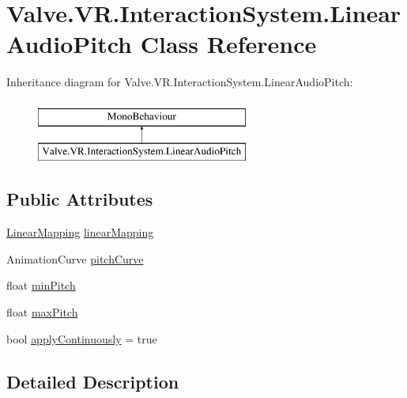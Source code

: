 \hypertarget{class_valve_1_1_v_r_1_1_interaction_system_1_1_linear_audio_pitch}{}\section{Valve.\+V\+R.\+Interaction\+System.\+Linear\+Audio\+Pitch Class Reference}
\label{class_valve_1_1_v_r_1_1_interaction_system_1_1_linear_audio_pitch}
Inheritance diagram for Valve.\+V\+R.\+Interaction\+System.\+Linear\+Audio\+Pitch\+:\begin{figure}[H]
\begin{center}
\leavevmode
\includegraphics[height=2.000000cm]{class_valve_1_1_v_r_1_1_interaction_system_1_1_linear_audio_pitch}
\end{center}
\end{figure}
\subsection*{Public Attributes}
\begin{DoxyCompactItemize}
\item 
\mbox{\hyperlink{class_valve_1_1_v_r_1_1_interaction_system_1_1_linear_mapping}{Linear\+Mapping}} \mbox{\hyperlink{class_valve_1_1_v_r_1_1_interaction_system_1_1_linear_audio_pitch_a099531e7f554877a0588b9466c1fe99e}{linear\+Mapping}}
\item 
Animation\+Curve \mbox{\hyperlink{class_valve_1_1_v_r_1_1_interaction_system_1_1_linear_audio_pitch_ac283968cd08adf62b4a7077ba7a667c2}{pitch\+Curve}}
\item 
float \mbox{\hyperlink{class_valve_1_1_v_r_1_1_interaction_system_1_1_linear_audio_pitch_a282682c2c1fc859dae276bda87fe6450}{min\+Pitch}}
\item 
float \mbox{\hyperlink{class_valve_1_1_v_r_1_1_interaction_system_1_1_linear_audio_pitch_a2f9aab9e3ee76ebc60d449d3bea85aa6}{max\+Pitch}}
\item 
bool \mbox{\hyperlink{class_valve_1_1_v_r_1_1_interaction_system_1_1_linear_audio_pitch_a9841aebb01a55332f4378a9d3296f2c1}{apply\+Continuously}} = true
\end{DoxyCompactItemize}


\subsection{Detailed Description}


